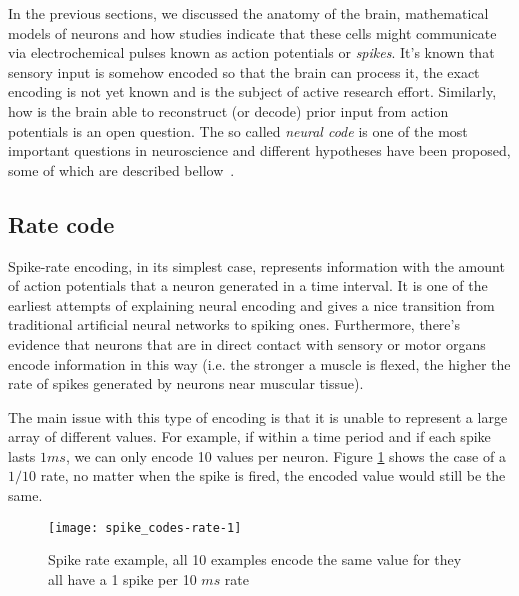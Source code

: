 In the previous sections, we discussed the anatomy of the brain, mathematical models of neurons and how studies indicate that these cells might communicate via electrochemical pulses known as action potentials or \emph{spikes}. It's known that sensory input is somehow encoded so that the brain can process it, the exact encoding is not yet known and is the subject of active research effort. Similarly, how is the brain able to reconstruct (or decode) prior input from action potentials is an open question. The so called \emph{neural code} is one of the most important questions in neuroscience and different hypotheses have been proposed, some of which are described bellow~\cite{dayan2001theoretical,gollisch2009throwing}.

\subsection{Rate code}
Spike-rate encoding, in its simplest case, represents information with the amount of action potentials that a neuron generated in a time interval. It is one of the earliest attempts of explaining neural encoding and gives a nice transition from traditional artificial neural networks to spiking ones. Furthermore, there's evidence that neurons that are in direct contact with sensory or motor organs encode information in this way (i.e. the stronger a muscle is flexed, the higher the rate of spikes generated by neurons near muscular tissue).

The main issue with this type of encoding is that it is unable to represent  a large array of different values. For example, if within a time period and if each spike lasts $1 ms$, we can only encode 10 values per neuron. Figure \ref{fig:neuro:spike-rate-encoding-cap} shows the case of a $1/10$ rate, no matter when the spike is fired, the encoded value would still be the same. 

\begin{figure}[hbt]
  \begin{center}
    \texttt{[image: spike\_codes-rate-1]}
    \caption{Spike rate example, all 10 examples encode the same value for they all have a 1 spike per 10 $ms$ rate}
    \label{fig:neuro:spike-rate-encoding-cap}
  \end{center}
\end{figure}

